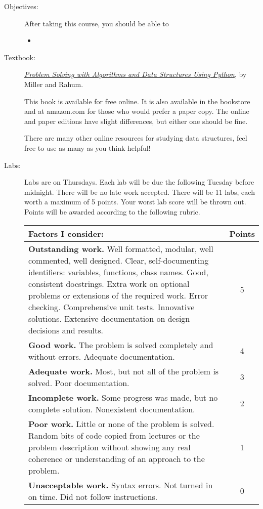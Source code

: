 \documentclass[12pt]{article}
\begin{document}
\begin{description}
\item[Objectives:] After taking this course, you should be 
able to
\begin{itemize}
\item
\end{itemize}

\item[Textbook:]
\href{https://runestone.academy/ns/books/published/pythonds/index.html}
{\em Problem Solving with Algorithms and Data Structures
Using Python}, by Miller and Rahum.

This book is available for free online.  
It is also available in the bookstore and at
amazon.com for those who would prefer a paper copy.
The online and paper editions have slight differences, but
either one should be fine.

There are many other online resources for studying
data structures, feel free to use as many as you think helpful!


\item[Labs:] Labs are on Thursdays.  Each lab will be due
the following Tuesday before midnight.  There will be no
late work accepted.   
There will be 11 labs, each worth a maximum of 5 points.  Your worst lab score will be 
thrown out.
Points will be awarded according to the
following rubric.

\begin{tabular}{p{}|c}
\bf Factors I consider: & \bf Points \\\hline
{\bf Outstanding work.}    Well formatted, modular,
well commented, well designed.  
Clear, self-documenting identifiers: variables, functions, class names.
Good, consistent docstrings.
 Extra work on optional problems or extensions
of the required work.  Error checking.  Comprehensive unit tests. Innovative solutions.
Extensive documentation on design decisions and results.
 & 5 \\\hline
{\bf Good work.}  The problem is solved completely and without errors.
Adequate documentation.
 & 4 \\\hline
{\bf Adequate work.}  Most, but not all of the problem is solved.  Poor documentation.
 & 3 \\\hline
 {\bf Incomplete work.}  Some progress was made, but no complete solution.
 Nonexistent documentation.
 & 2 \\\hline
{\bf Poor work.}  Little or none of the problem is solved.  Random bits of code copied
from lectures or the problem description without showing any real coherence
or understanding of an approach to the problem.
 & 1 \\\hline
{\bf Unacceptable work.}
 Syntax errors.  Not turned in on time.  Did not follow instructions. & 0 \\
\end{tabular}



\end{description}
\end{document}
